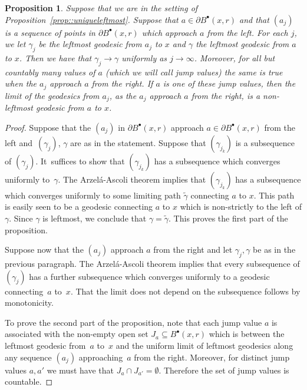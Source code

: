 \documentclass[JEP,XML,SOM,Unicode]{cedram}
\newcommand{\sbullet}{{\scriptscriptstyle\bullet}}
\theoremstyle{plain}
\numberwithin{theorem}{section}
\newtheorem{proposition}[theorem]{Proposition}
\theoremstyle{definition}
\let\wt\widetilde
\newcommand{\fb}[2]{B^\sbullet(#1,#2)}
\begin{document}
\begin{proposition}
\label{prop::leftmostconvergence}
Suppose that we are in the setting of Proposition~\ref{prop::uniqueleftmost}. Suppose that $a \in \partial \fb{x}{r}$ and that $(a_j)$ is a sequence of points in $\partial \fb{x}{r}$ which approach $a$ from the left. For each $j$, we let $\gamma_j$ be the leftmost geodesic from $a_j$ to $x$ and $\gamma$ the leftmost geodesic from $a$ to $x$. Then we have that $\gamma_j \to \gamma$ uniformly as $j \to \infty$. Moreover, for all but countably many values of $a$ (which we will call \emph{jump values}) the same is true when the $a_j$ approach $a$ from the right. If $a$ is one of these jump values, then the limit of the geodesics from $a_j$, as the $a_j$ approach $a$ from the right, is a non-leftmost geodesic from $a$ to $x$.
\end{proposition}
\begin{proof}
Suppose that the $(a_j)$ in $\partial \fb{x}{r}$ approach $a \in \partial \fb{x}{r}$ from the left and~$(\gamma_j)$, $\gamma$ are as in the statement. Suppose that $(\gamma_{j_k})$ is a subsequence of $(\gamma_j)$. It~suffices to show that $(\gamma_{j_k})$ has a subsequence which converges uniformly to~$\gamma$. The Arzelá-Ascoli theorem implies that $(\gamma_{j_k})$ has a subsequence which converges uniformly to some limiting path $\wt{\gamma}$ connecting $a$ to $x$. This path is easily seen to be a geodesic connecting $a$ to $x$ which is non-strictly to the left of $\gamma$. Since $\gamma$ is leftmost, we conclude that $\gamma = \wt{\gamma}$. This proves the first part of the proposition.

Suppose now that the $(a_j)$ approach $a$ from the right and let $\gamma_j,\gamma$ be as in the previous paragraph. The Arzelá-Ascoli theorem implies that every subsequence of $(\gamma_j)$ has a further subsequence which converges uniformly to a geodesic connecting~$a$ to~$x$. That the limit does not depend on the subsequence follows by monotonicity.

To prove the second part of the proposition, note that each jump value $a$ is associated with the non-empty open set $J_a \subseteq \fb{x}{r}$ which is between the leftmost geodesic from~$a$ to~$x$ and the uniform limit of leftmost geodesics along any sequence $(a_j)$ approaching~$a$ from the right. Moreover, for distinct jump values $a,a'$ we must have that $J_a \cap J_{a'} = \emptyset$. Therefore the set of jump values is countable.
\end{proof}
\end{document}

